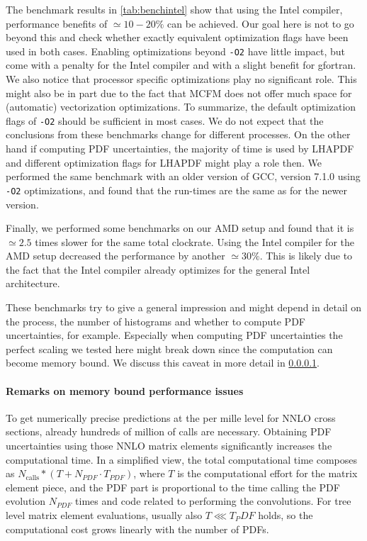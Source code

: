 The benchmark results in \ref{tab:benchintel} show that using the Intel compiler, performance benefits of $\simeq 
10-20\%$ can be achieved. Our goal here is not to go beyond this and check
whether exactly equivalent optimization flags have been used in both cases. Enabling optimizations beyond \texttt{-O2} 
have little impact, but come with a penalty for the Intel compiler and with a slight benefit for gfortran. We also
notice that processor specific optimizations play no significant role. This might also be in part due to the fact
that MCFM does not offer much space for (automatic) vectorization optimizations. To summarize, the default 
optimization flags of 
\texttt{-O2} should be sufficient in most cases. We do not expect that the conclusions from these benchmarks
change for different processes. On the other hand if computing PDF uncertainties, the majority of time
is used by LHAPDF and different optimization flags for LHAPDF might play a role then.
We performed the same benchmark with an older version of GCC, version 7.1.0 using \texttt{-O2} optimizations, and found 
that the run-times are the same as for the newer version.

Finally, we performed some benchmarks
on our AMD setup and found that it is $\simeq 2.5$ times slower for the same total clockrate. Using the Intel compiler
for the AMD setup decreased the performance by another $\simeq 30\%$. This is likely due to the fact that the Intel
compiler already optimizes for the general Intel architecture. 

These benchmarks try to give a general impression and might depend in detail on the process, the
number of histograms and whether to compute PDF uncertainties, for example. Especially when computing
PDF uncertainties the perfect scaling we tested here might break down since the computation can become
memory bound. We discuss this caveat in more detail in \ref{subsec:performance}.


\paragraph{Remarks on memory bound performance issues}
\label{subsec:performance}
To get numerically precise predictions at the per mille level for NNLO cross sections,
already hundreds of million of calls are necessary. Obtaining PDF uncertainties using
those NNLO matrix elements significantly increases the computational time. In a simplified view,
the total computational time composes as $N_{\text{calls}}*(T + N_{PDF}\cdot T_{PDF})$, where $T$ is the
computational effort for the matrix element piece, and the PDF part is proportional
to the time calling the PDF evolution $N_{PDF}$ times and code related to performing the convolutions.
For tree level matrix element evaluations, usually also $T \lll T_PDF$ holds, so the computational cost
grows linearly with the number of PDFs.

